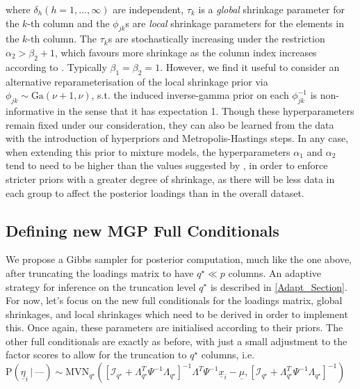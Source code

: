 \documentclass[a4paper,12pt,fleqn]{article}
\numberwithin{equation}{section}
\def\given{\,|\,}
\begin{document}
\noindent where $\delta_h \left(h=1,\ldots,\infty\right)$ are independent, $\tau_k$ is a \textit{global} shrinkage parameter for the $k$-th column and the $\phi_{jk}$s are \textit{local} shrinkage parameters for the elements in the $k$-th column. The $\tau_k$s are stochastically increasing under the restriction $\alpha_2 > \beta_2 + 1$, which favours more shrinkage as the column index increases according to \citet{Durante2016}. Typically $\beta_1 = \beta_2 = 1$. However, we find it useful to consider an alternative reparameterisation of the local shrinkage prior via $\phi_{jk}\sim\textrm{Ga}\left(\nu + 1, \nu\right)$, s.t. the induced inverse-gamma prior on each $\phi_{jk}^{-1}$ is non-informative in the sense that it has expectation 1. Though these hyperparameters remain fixed under our consideration, they can also be learned from the data with the introduction of hyperpriors and Metropolis-Hastings steps. In any case, when extending this prior to mixture models, the hyperparameters $\alpha_1$ and $\alpha_2$ tend to need to be higher than the values suggested by \citet{Bhattacharya2011}, in order to enforce stricter priors with a greater degree of shrinkage, as there will be less data in each group to affect the posterior loadings than in the overall dataset.

\subsection[Defining new MGP Full Conditionals]{Defining new MGP Full Conditionals}
We propose a Gibbs sampler for posterior computation, much like the one above, after truncating the loadings matrix to have $q^\star \ll p$ columns. An adaptive strategy for inference on the truncation level $q^\star$ is described in \ref{Adapt_Section}. For now, let's focus on the new full conditionals for the loadings matrix, global shrinkages, and local shrinkages which need to be derived in order to implement this. Once again, these parameters are initialised according to their priors. The other full conditionals are exactly as before, with just a small adjustment to the factor scores to allow for the truncation to $q^\star$ columns, i.e. $\mathrm{P}\left(\underline{\eta}_i \given \mbox{---}\right) \sim  \textrm{MVN}_{q^\star}\left(\left[\mathcal{I}_{q^\star} + \Lambda^T_{q^\star}\Psi^{-1}\Lambda_{q^\star}\right]^{-1}\Lambda^T\Psi^{-1}\underline{x}_i - \underline{\mu},\left[\mathcal{I}_{q^\star} + \Lambda^T_{q^\star}\Psi^{-1}\Lambda_{q^\star}\right]^{-1}\right)$
\end{document}
